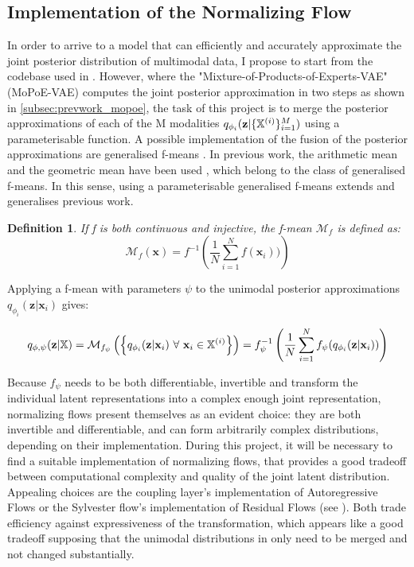 \documentclass[english]{scrartcl}
\newtheorem{definition}{Definition}
\begin{document}
    \subsection{Implementation of the Normalizing Flow}
    In order to arrive to a model that can efficiently and accurately approximate the joint posterior distribution of multimodal data, I propose to start from the codebase used in \citet{sutter_generalized_2020}.
    However, where the "Mixture-of-Products-of-Experts-VAE" (MoPoE-VAE) computes the joint posterior approximation in two steps as shown in \cref{subsec:prevwork_mopoe}, the task of this project is to merge the posterior approximations of each of the M modalities $q_{\phi_i}(\textbf{z}|\{\mathbb{X}^{(i)}\}_{i=1}^M)$ using a parameterisable function.
    A possible implementation of the fusion of the posterior approximations are generalised f-means \citep{niculescu_convex_2018}.
    In previous work, the arithmetic mean and the geometric mean have been used  \citep[PoE,MoE,MoPoE]{wu_multimodal_2018,shi_variational_2019,sutter_generalized_2020}, which belong to the class of generalised f-means.
    In this sense, using a parameterisable generalised f-means extends and generalises previous work.
    \begin{definition}
        If f is both continuous and injective, the f-mean $\mathcal{M}_f$ is defined as:
        \begin{equation}
             \mathcal{M}_{f}\left( \textbf{x} \right) = f^{-1}\left( \frac{1}{N} \sum ^N _{i=1} f(\textbf{x}_i)) \right)
        \end{equation}
    \end{definition}

    Applying a f-mean with parameters $\psi$ to the unimodal posterior approximations $q_{\phi _i}(\textbf{z}|\textbf{x}_i)$ gives:

    \begin{equation}\label{eq:merge_function}
        q_{\phi, \psi}(\textbf{z} | \mathbb{X}) = \mathcal{M}_{f_{\psi}}\left( \left\{ q_{\phi _i}(\textbf{z}|\textbf{x}_i)\ \forall\ \textbf{x}_i \in \mathbb{X}^{(i)} \right\} \right) = f_{\psi}^{-1}\left( \frac{1}{N} \sum ^N _{i=1} f_{\psi}(q_{\phi _i}(\textbf{z}|\textbf{x}_i)) \right)
    \end{equation}

    Because $f_{\psi}$ needs to be both differentiable, invertible and transform the individual latent representations into a complex enough joint representation, normalizing flows present themselves as an evident choice:
    they are both invertible and differentiable, and can form arbitrarily complex distributions, depending on their implementation.
    During this project, it will be necessary to find a suitable implementation of normalizing flows, that provides a good tradeoff between computational complexity and quality of the joint latent distribution.
    Appealing choices are the coupling layer's implementation of Autoregressive Flows or the Sylvester flow's implementation of Residual Flows (see ).
    Both trade efficiency against expressiveness of the transformation, which appears like a good tradeoff supposing that the unimodal distributions in  only need to be merged and not changed substantially.
\end{document}
